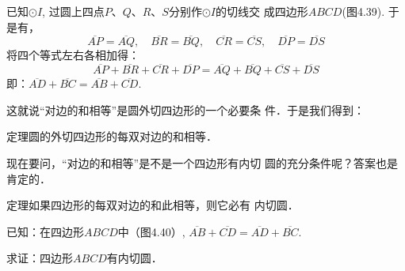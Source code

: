 已知$\odot I$, 过圆上四点$P$、$Q$、$R$、$S$分别作$\odot I$的切线交
成四边形$ABCD$(图4.39). 于是有，
\begin{equation*}
    \overline{AP}=\overline{AQ},\quad \overline{BR}=\overline{BQ},\quad \overline{CR}=\overline{CS},\quad 
\overline{DP}=\overline{DS}\tag{切线长定理}
\end{equation*}
将四个等式左右各相加得：
\[\overline{AP}+\overline{BR}+\overline{CR}+\overline{DP}=\overline{AQ}+\overline{BQ}+\overline{CS}+\overline{DS}\]
即：$\overline{AD}+\overline{BC}=\overline{AB}+\overline{CD}$.

这就说“对边的和相等”是圆外切四边形的一个必要条
件．于是我们得到：

\begin{blk}
    {定理}圆的外切四边形的每双对边的和相等．
\end{blk}

现在要问，“对边的和相等”是不是一个四边形有内切
圆的充分条件呢？答案也是肯定的．

\begin{blk}
    {定理}如果四边形的每双对边的和此相等，则它必有
内切圆．
\end{blk}

已知：在四边形$ABCD$中（图4.40）, $\overline{AB}+\overline{CD}=\overline{AD}+\overline{BC}$.

求证：四边形$ABCD$有内切圆．

\begin{figure}[htp]
    \centering
{}
    \caption{}
\end{figure}


